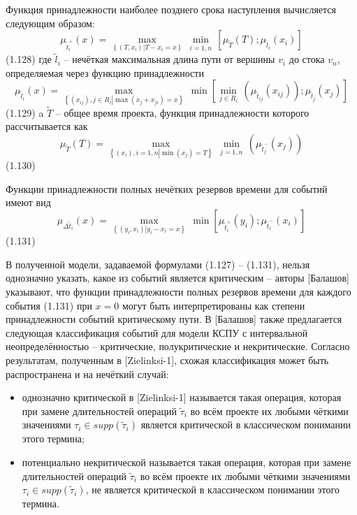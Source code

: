 Функция принадлежности наиболее позднего срока наступления вычисляется следующим образом: 
	\[{{\mu }_{\tilde{t}_{i}^{+}}}\left( x \right)=\underset{\left\{ \left( T,{{x}_{i}} \right)\left| T-{{x}_{i}}=x \right. \right\}}{\mathop{\max }}\,\underset{i=\overline{1,n}}{\mathop{\min }}\,\left[ {{\mu }_{{\tilde{T}}}}\left( T \right);{{\mu }_{{{{\tilde{l}}}_{i}}}}\left( {{x}_{i}} \right) \right]\] 	(1.128)
где $\tilde l_i$ – нечёткая максимальная длина пути от вершины ${{v}_{i}}$ до стока ${{v}_{n}}$, определяемая через функцию принадлежности
	\[{{\mu }_{{{{\tilde{l}}}_{i}}}}\left( x \right)=\underset{\left\{ \left( {{x}_{ij}} \right),j\in {{R}_{i}}\left| \max \left( {{x}_{j}}+{{x}_{ji}} \right)=x \right. \right\}}{\mathop{\max }}\,\min \left[ \underset{j\in {{R}_{i}}}{\mathop{\min }}\,\left( {{\mu }_{{{{\tilde{t}}}_{ij}}}}\left( {{x}_{ij}} \right) \right);{{\mu }_{{{{\tilde{l}}}_{j}}}}\left( {{x}_{j}} \right) \right]\] 	(1.129)
a $\tilde T$ – общее время проекта, функция принадлежности которого рассчитывается как
	\[{{\mu }_{{\tilde{T}}}}\left( T \right)=\underset{\left\{ \left( {{x}_{i}} \right),i=\overline{1,n}\left| \min \left( {{x}_{j}} \right)=T \right. \right\}}{\mathop{\max }}\,\underset{j=\overline{1,n}}{\mathop{\min }}\,\left( {{\mu }_{\tilde{t}_{j}^{-}}}\left( {{x}_{j}} \right) \right)\] 	(1.130)

Функции принадлежности полных нечётких резервов времени для событий имеют вид
	\[{{\mu }_{\Delta {{{\tilde{t}}}_{i}}}}\left( x \right)=\underset{\left\{ \left( {{y}_{i}},{{x}_{i}} \right)\left| {{y}_{i}}-{{x}_{i}}=x \right. \right\}}{\mathop{\max }}\,\min \left[ {{\mu }_{\tilde{t}_{i}^{+}}}\left( {{y}_{i}} \right);{{\mu }_{\tilde{t}_{i}^{-}}}\left( {{x}_{i}} \right) \right]\] 	(1.131)
	
В полученной модели, задаваемой формулами (1.127) – (1.131), нельзя однозначно указать, какое из событий является критическим – авторы [Балашов] указывают, что функции принадлежности полных резервов времени для каждого события (1.131) при $x=0$ могут быть интерпретированы как степени принадлежности событий критическому пути. В [Балашов] также предлагается следующая классификация событий для модели КСПУ с интервальной неопределённостью – критические, полукритические и некритические. Согласно результатам, полученным в [Zielinksi-1], схожая классификация может быть распространена и на нечёткий случай:
\begin{itemize}
  \item однозначно критической в [Zielinksi-1] называется такая операция, которая при замене длительностей операций $\tilde \tau_i$ во всём проекте их любыми чёткими значениями ${{\tau }_{i}}\in supp\left( {{{\tilde{\tau }}}_{i}} \right)$ является критической в классическом понимании этого термина;
  \item потенциально некритической называется такая операция, которая при замене длительностей операций $\tilde \tau_i$ во всём проекте их любыми чёткими значениями ${{\tau }_{i}}\in supp\left( {{{\tilde{\tau }}}_{i}} \right)$, не является критической в классическом понимании этого термина.
\end{itemize}

